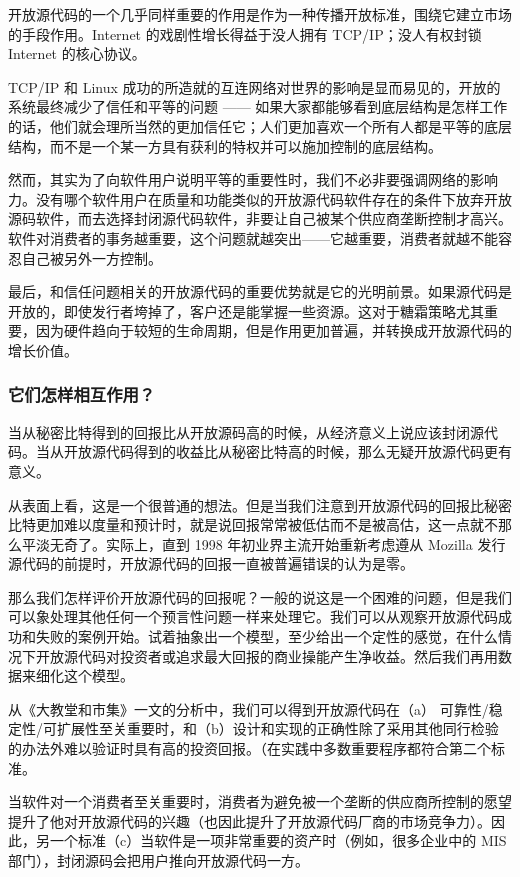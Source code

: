开放源代码的一个几乎同样重要的作用是作为一种传播开放标准，围绕它建立市场的手段作用。Internet 的戏剧性增长得益于没人拥有 TCP/IP；没人有权封锁 Internet 的核心协议。


TCP/IP 和 Linux 成功的所造就的互连网络对世界的影响是显而易见的，开放的系统最终减少了信任和平等的问题 —— 如果大家都能够看到底层结构是怎样工作的话，他们就会理所当然的更加信任它；人们更加喜欢一个所有人都是平等的底层结构，而不是一个某一方具有获利的特权并可以施加控制的底层结构。


然而，其实为了向软件用户说明平等的重要性时，我们不必非要强调网络的影响力。没有哪个软件用户在质量和功能类似的开放源代码软件存在的条件下放弃开放源码软件，而去选择封闭源代码软件，非要让自己被某个供应商垄断控制才高兴。软件对消费者的事务越重要，这个问题就越突出——它越重要，消费者就越不能容忍自己被另外一方控制。


最后，和信任问题相关的开放源代码的重要优势就是它的光明前景。如果源代码是开放的，即使发行者垮掉了，客户还是能掌握一些资源。这对于糖霜策略尤其重要，因为硬件趋向于较短的生命周期，但是作用更加普遍，并转换成开放源代码的增长价值。

\subsubsection{它们怎样相互作用？}
当从秘密比特得到的回报比从开放源码高的时候，从经济意义上说应该封闭源代码。当从开放源代码得到的收益比从秘密比特高的时候，那么无疑开放源代码更有意义。


从表面上看，这是一个很普通的想法。但是当我们注意到开放源代码的回报比秘密比特更加难以度量和预计时，就是说回报常常被低估而不是被高估，这一点就不那么平淡无奇了。实际上，直到 1998 年初业界主流开始重新考虑遵从 Mozilla 发行源代码的前提时，开放源代码的回报一直被普遍错误的认为是零。


那么我们怎样评价开放源代码的回报呢？一般的说这是一个困难的问题，但是我们可以象处理其他任何一个预言性问题一样来处理它。我们可以从观察开放源代码成功和失败的案例开始。试着抽象出一个模型，至少给出一个定性的感觉，在什么情况下开放源代码对投资者或追求最大回报的商业操能产生净收益。然后我们再用数据来细化这个模型。


从《大教堂和市集》一文的分析中，我们可以得到开放源代码在（a） 可靠性/稳定性/可扩展性至关重要时，和（b）设计和实现的正确性除了采用其他同行检验的办法外难以验证时具有高的投资回报。（在实践中多数重要程序都符合第二个标准。


当软件对一个消费者至关重要时，消费者为避免被一个垄断的供应商所控制的愿望提升了他对开放源代码的兴趣（也因此提升了开放源代码厂商的市场竞争力）。因此，另一个标准（c）当软件是一项非常重要的资产时（例如，很多企业中的 MIS 部门），封闭源码会把用户推向开放源代码一方。


